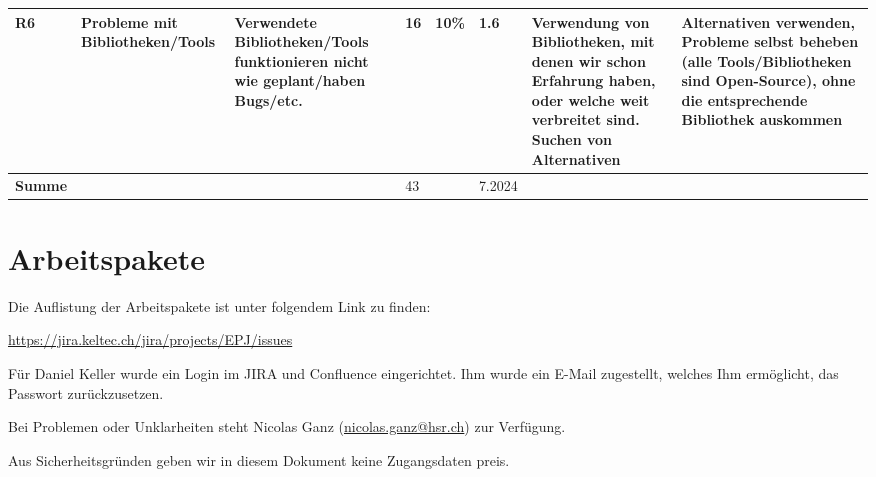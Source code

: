 \documentclass[a4paper]{article}
\let\oldsection\section
\renewcommand\section{\clearpage\oldsection}
\def\jiraurl{https://jira.keltec.ch/jira}
\begin{document}
\begin{landscape}
\begin{tabulary}{\linewidth}{lLLlLLLL}
    R6 &
    Probleme mit Bibliotheken/Tools &
    Verwendete Bibliotheken/Tools funktionieren nicht wie geplant/haben Bugs/etc. &
    16 &
    10\% &
    1.6 &
    Verwendung von Bibliotheken, mit denen wir schon Erfahrung haben, oder welche weit verbreitet sind. Suchen von Alternativen &
    Alternativen verwenden, Probleme selbst beheben (alle Tools/Bibliotheken sind Open-Source), ohne die entsprechende Bibliothek auskommen \\ \midrule

    \textbf{Summe} & & & 43 & & 7.2024 & & \\
    \bottomrule
  \end{tabulary}
\end{landscape}
\restoregeometry

\section{Arbeitspakete}

Die Auflistung der Arbeitspakete ist unter folgendem Link zu finden:

\url{\jiraurl/projects/EPJ/issues}

Für Daniel Keller wurde ein Login im JIRA und Confluence eingerichtet.
Ihm wurde ein E-Mail zugestellt, welches Ihm ermöglicht, das Passwort zurückzusetzen.

Bei Problemen oder Unklarheiten steht Nicolas Ganz (\url{nicolas.ganz@hsr.ch}) zur Verfügung.

Aus Sicherheitsgründen geben wir in diesem Dokument keine Zugangsdaten preis.

%
%
%
%
\end{document}
